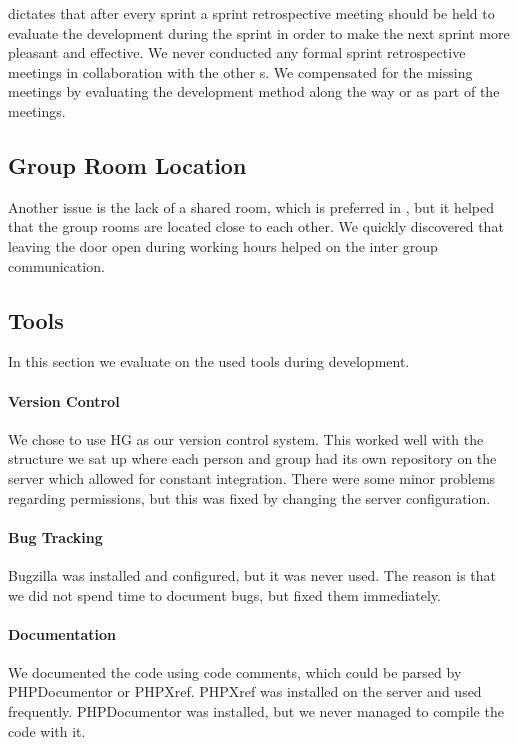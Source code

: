 \scrum{} dictates that after every sprint a sprint retrospective meeting should be held to evaluate the development during the sprint in order to make the next sprint more pleasant and effective.
We never conducted any formal sprint retrospective meetings in collaboration with the other \subgroup{}s.
We compensated for the missing meetings by evaluating the development method along the way or as part of the \sos{} meetings. 





\subsection{Group Room Location}
Another issue is the lack of a shared room, which is preferred in \sos{}, but it helped that the group rooms are located close to each other. 
We quickly discovered that leaving the door open during working hours helped on the inter group communication. 



\subsection{Tools}
In this section we evaluate on the used tools during development. 

\paragraph{Version Control}
We chose to use HG as our version control system. 
This worked well with the structure we sat up where each person and group had its own repository on the server which allowed for constant integration. 
There were some minor problems regarding permissions, but this was fixed by changing the server configuration. 


\paragraph{Bug Tracking}
Bugzilla was installed and configured, but it was never used. 
The reason is that we did not spend time to document bugs, but fixed them immediately. 

\paragraph{Documentation}
We documented the code using code comments, which could be parsed by PHPDocumentor or PHPXref. 
PHPXref was installed on the server and used frequently. 
PHPDocumentor was installed, but we never managed to compile the code with it. 


